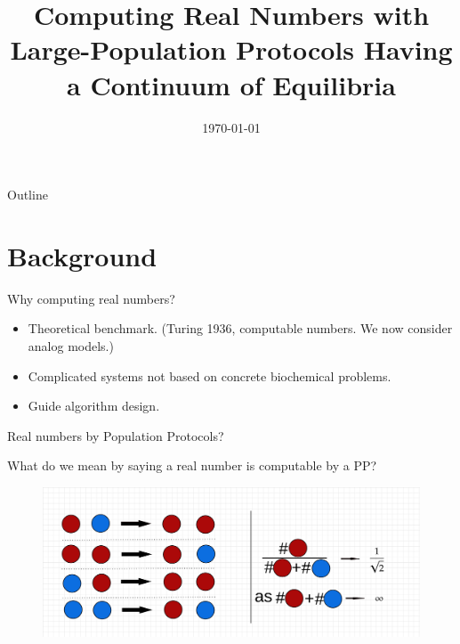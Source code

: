 \documentclass[aspectratio=169]{beamer}
\title[]{Computing Real Numbers with Large-Population Protocols Having a Continuum of Equilibria}
\date[]{\large{\today}}
\author[Xiang\,Huang \& Rachel.\,Huls]
{%

  \texorpdfstring{
    \begin{columns}%
      \column{.45\linewidth}
      \centering
      Xiang Huang\\
      \href{mailto:xhuan5@uis.edu}{(xhuan5@uis.edu)}\\
      \href{https://xianghuang.org}{xianghuang.org}
      \column{.45\linewidth}
      \centering
      Rachel Huls\\
      \href{mailto:rhuls2@uis.edu}{(rhuls2@uis.edu)}
    \end{columns}
  }
  {Xiang Huang \& Rachel Huls}
}
\institute{\Large{University of Illinois Springfield}} %
\begin{document}
\begin{frame}
\maketitle
\end{frame}

\begin{frame}{Outline}
\tableofcontents
\end{frame}

\section{Background}

\begin{frame}{Why computing real numbers?}
\begin{itemize}
    \item Theoretical benchmark. (Turing 1936, computable numbers. We now consider analog models.) \pause
    \item Complicated systems not based on concrete biochemical problems. \pause
    \item Guide algorithm design.
\end{itemize}
\end{frame}

\begin{frame}[Clean]{Real numbers by Population Protocols?}

What do we mean by saying a real number is computable by a PP?

\begin{example}
\begin{figure}[tb]
    \centering
    \includegraphics[scale=0.2]{ppexample1}
\end{figure}
\end{example}
\end{frame}
\end{document}
